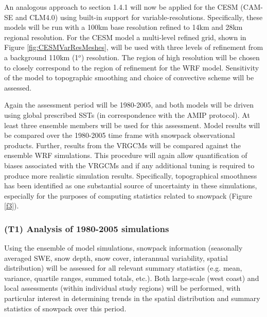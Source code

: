 \documentclass[11pt]{article}
\begin{document}
An analogous approach to section 1.4.1 will now be applied  for  the  CESM  (CAM-SE and CLM4.0) using built-in support for variable-resolutions.  Specifically, these models will be run with a 100km base resolution refined to 14km and 28km regional resolution. For the CESM model a multi-level refined grid, shown in Figure \ref{fig:CESMVarResMeshes}, will be used with three levels of refinement from a background 110km (1$^{o}$) resolution. The region of high resolution will be chosen to closely correspond to the region of refinement for the WRF model.  Sensitivity of the model to topographic smoothing and choice of convective scheme will be assessed.  %

Again the assessment period will be 1980-2005, and both models will be driven using global prescribed SSTs (in correspondence with the AMIP protocol).  At least three ensemble members will be used for this assessment. Model results will be compared over the 1980-2005 time frame with snowpack observational products. Further, results from the VRGCMs will be compared against the ensemble WRF simulations. This procedure will again allow quantification of biases associated with the VRGCMs and if any additional tuning is required to produce more realistic simulation results.  Specifically, topographical smoothness has been identified as one substantial source of uncertainty in these simulations, especially for the purposes of computing statistics related to snowpack (Figure \ref{f3}).

\subsubsection{(T1) Analysis of 1980-2005 simulations}

Using the ensemble of model simulations, snowpack information (seasonally averaged SWE, snow depth, snow cover, interannual variability, spatial distribution) will be assessed for all relevant summary statistics (e.g. mean, variance, quartile ranges, summed totals, etc.). Both large-scale (west coast) and local assessments (within individual study regions) will be performed, with particular interest in determining trends in the spatial distribution and summary statistics of snowpack over this period.

\end{document}
